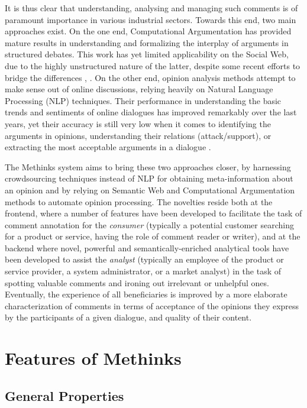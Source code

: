 \documentclass[runningheads,a4paper]{llncs}
\begin{document}
It is thus clear that understanding, analysing and managing such comments is of paramount importance in various industrial sectors. Towards this end, two main approaches exist. On the one end, Computational Argumentation  \cite{_Ref490738126} has provided mature results in understanding and formalizing the interplay of arguments in structured debates. This work has yet limited applicability on the Social Web, due to the highly unstructured nature of the latter, despite some recent efforts to bridge the differences  \cite{_Ref490738134},  \cite{_Ref490738141}. On the other end, opinion analysis methods attempt to make sense out of online discussions, relying heavily on Natural Language Processing (NLP) techniques. Their performance in understanding the basic trends and sentiments of online dialogues has improved remarkably over the last years, yet their accuracy is still very low when it comes to identifying the arguments in opinions, understanding their relations (attack/support), or extracting the most acceptable arguments in a dialogue  \cite{_Ref490738149}.

The Methinks system aims to bring these two approaches closer, by harnessing crowdsourcing techniques instead of NLP for obtaining meta-information about an opinion and by relying on Semantic Web and Computational Argumentation methods to automate opinion processing. The novelties reside both at the frontend, where a number of features have been developed to facilitate the task of comment annotation for the {\em consumer} (typically a potential customer searching for a product or service, having the role of comment reader or writer), and at the backend where novel, powerful and semantically-enriched analytical tools have been developed to assist the {\em analyst} (typically an employee of the product or service provider, a system administrator, or a market analyst) in the task of spotting valuable comments and ironing out irrelevant or unhelpful ones. Eventually, the experience of all beneficiaries is improved by a more elaborate characterization of comments in terms of acceptance of the opinions they express by the participants of a given dialogue, and quality of their content.

\section{Features of Methinks}

\subsection{General Properties}
\end{document}
